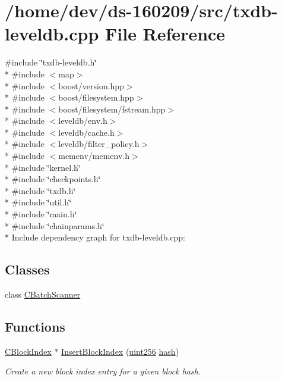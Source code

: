 \hypertarget{txdb-leveldb_8cpp}{}\section{/home/dev/ds-\/160209/src/txdb-\/leveldb.cpp File Reference}
\label{txdb-leveldb_8cpp}
{\ttfamily \#include \char`\"{}txdb-\/leveldb.\+h\char`\"{}}\\*
{\ttfamily \#include $<$map$>$}\\*
{\ttfamily \#include $<$boost/version.\+hpp$>$}\\*
{\ttfamily \#include $<$boost/filesystem.\+hpp$>$}\\*
{\ttfamily \#include $<$boost/filesystem/fstream.\+hpp$>$}\\*
{\ttfamily \#include $<$leveldb/env.\+h$>$}\\*
{\ttfamily \#include $<$leveldb/cache.\+h$>$}\\*
{\ttfamily \#include $<$leveldb/filter\+\_\+policy.\+h$>$}\\*
{\ttfamily \#include $<$memenv/memenv.\+h$>$}\\*
{\ttfamily \#include \char`\"{}kernel.\+h\char`\"{}}\\*
{\ttfamily \#include \char`\"{}checkpoints.\+h\char`\"{}}\\*
{\ttfamily \#include \char`\"{}txdb.\+h\char`\"{}}\\*
{\ttfamily \#include \char`\"{}util.\+h\char`\"{}}\\*
{\ttfamily \#include \char`\"{}main.\+h\char`\"{}}\\*
{\ttfamily \#include \char`\"{}chainparams.\+h\char`\"{}}\\*
Include dependency graph for txdb-\/leveldb.cpp\+:
\subsection*{Classes}
\begin{DoxyCompactItemize}
\item 
class \hyperlink{class_c_batch_scanner}{C\+Batch\+Scanner}
\end{DoxyCompactItemize}
\subsection*{Functions}
\begin{DoxyCompactItemize}
\item 
\hyperlink{class_c_block_index}{C\+Block\+Index} $\ast$ \hyperlink{txdb-leveldb_8cpp_af3adfd64a90ee443bfa5fe16321aa2d7}{Insert\+Block\+Index} (\hyperlink{classuint256}{uint256} \hyperlink{cache_8cc_a11ecb029164e055f28f4123ce3748862}{hash})
\begin{DoxyCompactList}\small\item\em Create a new block index entry for a given block hash. \end{DoxyCompactList}\end{DoxyCompactItemize}
